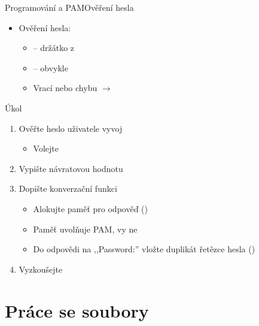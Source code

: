 \begin{frame}{Programování a PAM}{Ověření hesla}

  \begin{itemize}
    \item Ověření hesla: 
    \begin{itemize}
      \item {} -- držátko z 
      \item {} -- obvykle 
      \item Vrací  nebo chybu $\rightarrow$
    \end{itemize}
  \end{itemize}

\end{frame}

\begin{frame}{Úkol}

  \begin{enumerate}
    \item Ověřte heslo uživatele vyvoj
    \begin{itemize}
      \item Volejte 
    \end{itemize}

    \item Vypište návratovou hodnotu

    \item Dopište konverzační funkci
    \begin{itemize}
      \item Alokujte paměť pro odpověď ()
      \item Paměť uvolňuje PAM, vy ne
      \item Do odpovědi na ,,Password:'' vložte duplikát řetězce hesla
	()
    \end{itemize}

    \item Vyzkoušejte
  \end{enumerate}

\end{frame}

\section{Práce se soubory}
\frame{\sectionpage}

